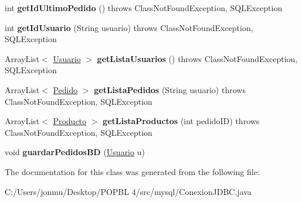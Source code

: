 \begin{DoxyCompactItemize}
\item 
\mbox{\label{classmysql_1_1_conexion_j_d_b_c_abbadbe682819495c2b2afd962afba245}} 
int {\bfseries get\+Id\+Ultimo\+Pedido} ()  throws Class\+Not\+Found\+Exception, S\+Q\+L\+Exception 
\item 
\mbox{\label{classmysql_1_1_conexion_j_d_b_c_a4dde03f79391c9a52f7a84e281c5a696}} 
int {\bfseries get\+Id\+Usuario} (String usuario)  throws Class\+Not\+Found\+Exception, S\+Q\+L\+Exception 
\item 
\mbox{\label{classmysql_1_1_conexion_j_d_b_c_afa9f004689cee7a90e6a19c359409e04}} 
Array\+List$<$ \mbox{\hyperlink{classobjetos_1_1_usuario}{Usuario}} $>$ {\bfseries get\+Lista\+Usuarios} ()  throws Class\+Not\+Found\+Exception, S\+Q\+L\+Exception 
\item 
\mbox{\label{classmysql_1_1_conexion_j_d_b_c_a38333a2f31d016faaf14c08901c6ffea}} 
Array\+List$<$ \mbox{\hyperlink{classobjetos_1_1_pedido}{Pedido}} $>$ {\bfseries get\+Lista\+Pedidos} (String usuario)  throws Class\+Not\+Found\+Exception, S\+Q\+L\+Exception 
\item 
\mbox{\label{classmysql_1_1_conexion_j_d_b_c_a93e878bd79640edb42bbaa5e11217f8e}} 
Array\+List$<$ \mbox{\hyperlink{classobjetos_1_1_producto}{Producto}} $>$ {\bfseries get\+Lista\+Productos} (int pedido\+ID)  throws Class\+Not\+Found\+Exception, S\+Q\+L\+Exception 
\item 
\mbox{\label{classmysql_1_1_conexion_j_d_b_c_a5dbbd093ae378b5b023127bdf0ccf88e}} 
void {\bfseries guardar\+Pedidos\+BD} (\mbox{\hyperlink{classobjetos_1_1_usuario}{Usuario}} u)
\end{DoxyCompactItemize}


The documentation for this class was generated from the following file\+:\begin{DoxyCompactItemize}
\item 
C\+:/\+Users/jonmu/\+Desktop/\+P\+O\+P\+B\+L 4/src/mysql/Conexion\+J\+D\+B\+C.\+java\end{DoxyCompactItemize}
